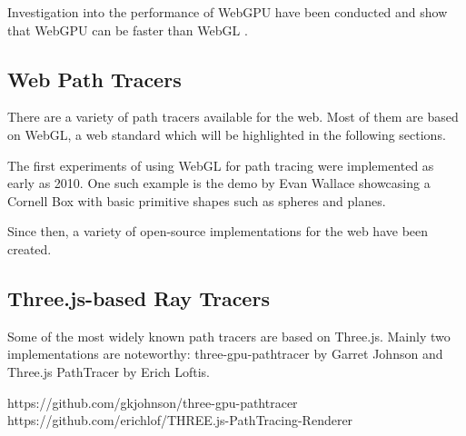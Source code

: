 Investigation into the performance of WebGPU have been conducted and show that WebGPU can be faster than WebGL \cite{fransson2023performance, CHICKERUR2024919}.
 

\subsection{Web Path Tracers}

There are a variety of path tracers available for the web. Most of them are based on WebGL, a web standard which will be highlighted in the following sections.

The first experiments of using WebGL for path tracing were implemented as early as 2010. One such example is the demo by Evan Wallace showcasing a Cornell Box with basic primitive shapes such as spheres and planes.

Since then, a variety of open-source implementations for the web have been created.

\subsection{Three.js-based Ray Tracers}

Some of the most widely known path tracers are based on Three.js. Mainly two implementations are noteworthy: three-gpu-pathtracer by Garret Johnson and Three.js PathTracer by Erich Loftis.

https://github.com/gkjohnson/three-gpu-pathtracer
https://github.com/erichlof/THREE.js-PathTracing-Renderer
